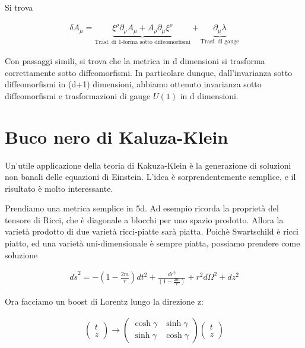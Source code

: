 \documentclass{report}
\begin{document}
Si trova

\begin{align}
    \delta A_\mu = \underbrace{\xi^\rho \partial_\rho A_\mu + A_\rho \partial_\mu \xi^\rho}_{\text{Trasf. di 1-forma sotto diffeomorfismi}} + \underbrace{\partial_\mu\lambda}_{\text{Trasf. di gauge}}
\end{align}

Con passaggi simili, si trova che la metrica in d dimensioni si trasforma correttamente sotto diffeomorfismi. In particolare dunque, dall'invarianza sotto diffeomorfismi in (d+1) dimensioni, abbiamo ottenuto invarianza sotto diffeomorfismi e trasformazioni di gauge \(U(1)\) in d dimensioni. 

\section{Buco nero di Kaluza-Klein}

Un'utile applicazione della teoria di Kakuza-Klein è la generazione di soluzioni non banali delle equazioni di Einstein. L'idea è sorprendentemente semplice, e il risultato è molto interessante. 

Prendiamo una metrica semplice in 5d. Ad esempio ricorda la proprietà del tensore di Ricci, che è diagonale a blocchi per uno spazio prodotto. Allora la varietà prodotto di due varietà ricci-piatte sarà piatta. Poichè Swartschild è ricci piatto, ed una varietà uni-dimensionale è sempre piatta, possiamo prendere come soluzione 

\begin{align}
    d\tilde{s}^2 = -\left(1 - \frac{2m}{r} \right)dt^2 + \frac{dr^2}{\left(1 - \frac{2m}{r} \right)} + r^2d\Omega^2 +dz^2 
\end{align}

Ora facciamo un boost di Lorentz lungo la direzione z: 

\begin{align}
    \begin{pmatrix}
        t \\ z
    \end{pmatrix} \rightarrow \begin{pmatrix}
        \cosh\gamma & \sinh\gamma \\
        \sinh\gamma & \cosh\gamma 
    \end{pmatrix} \begin{pmatrix}
        t \\ z 
    \end{pmatrix}
\end{align}
\end{document}
